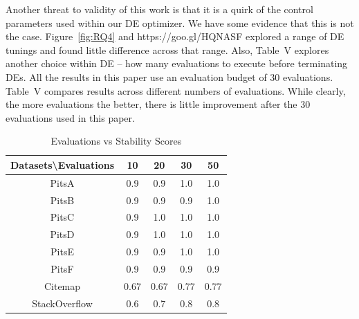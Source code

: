 \documentclass[10pt,conference]{IEEEtran}
\theoremstyle{break}
\begin{document}
Another threat to validity of this work is that it is a quirk of the control
parameters used within our DE optimizer.
We have some evidence that this is not the case.
Figure~\ref{fig:RQ4} and https://goo.gl/HQNASF explored a range of DE tunings and found
little difference across that range. Also, Table~V explores another choice within DE -- how
many evaluations to execute before terminating DEs. All the results in this paper use an
evaluation budget of 30 evaluations. Table~V
compares results across different numbers of evaluations. While clearly,
the more evaluations the better, there is little improvement after the
30 evaluations used in this paper.


\begin{table}[!htbp]
\begin{center}
\begin{tabular}{|c|c|c|c|c|}
\hline 
\textbf{Datasets\textbackslash Evaluations} & \textbf{10} & \textbf{20} & \textbf{30} &
\textbf{50} \\[0.5ex]
\hline
PitsA & 0.9 & 0.9 & 1.0 & 1.0\\ 
\hline
PitsB & 0.9 & 0.9 & 0.9 & 1.0 \\
\hline
PitsC & 0.9 & 1.0 & 1.0 & 1.0\\ 
\hline
PitsD & 0.9 & 1.0 & 1.0 & 1.0\\ 
\hline
PitsE & 0.9 & 0.9 & 1.0 & 1.0\\
\hline
PitsF & 0.9 & 0.9 & 0.9 & 0.9\\
\hline
Citemap & 0.67 & 0.67 & 0.77 & 0.77\\
\hline
StackOverflow & 0.6 & 0.7 & 0.8 & 0.8\\
\hline
\end{tabular}
\end{center}
\caption{Evaluations vs Stability Scores}
\label{tb:tablename1}
\end{table}

\end{document}
